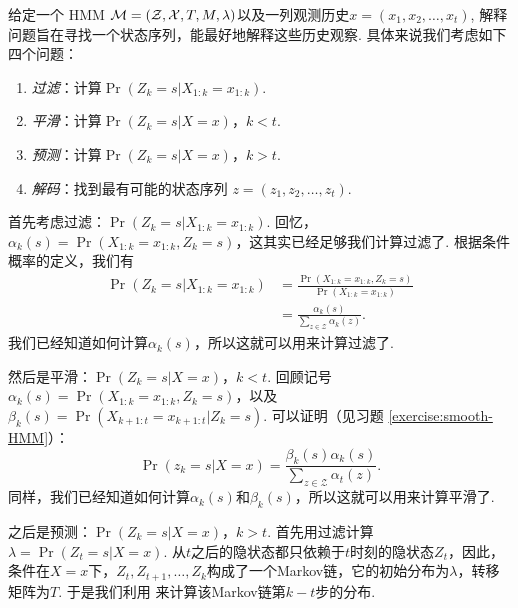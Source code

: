 给定一个 HMM $\mathcal M = (\mathcal Z, \mathcal X, T, M, \lambda)$以及一列观测历史$x = (x_1, x_2, \dots, x_t)$, 解释问题旨在寻找一个状态序列，能最好地解释这些历史观察. 具体来说我们考虑如下四个问题：
\begin{enumerate}
    \item \textit{过滤}：计算$\Pr(Z_k = s|X_{1:k}=x_{1:k})$.
    \item \textit{平滑}：计算$\Pr(Z_k = s|X=x)$，$k < t$.
    \item \textit{预测}：计算$\Pr(Z_k = s|X=x)$，$k > t$.
    \item \textit{解码}：找到最有可能的状态序列 $z = (z_1, z_2, \dots, z_t)$.
\end{enumerate}

首先考虑过滤：$\Pr(Z_k = s|X_{1:k}=x_{1:k})$. 回忆，$\alpha_k(s)= \Pr(X_{1:k}=x_{1:k}, Z_k=s)$，这其实已经足够我们计算过滤了. 根据条件概率的定义，我们有
\begin{align*}
    \Pr(Z_k = s|X_{1:k}=x_{1:k}) & = \frac{\Pr(X_{1:k}=x_{1:k}, Z_k=s)}{\Pr(X_{1:k}=x_{1:k})} \\
    &= \frac{\alpha_k(s)}{\sum_{z\in\mathcal Z}\alpha_k(z)}.
\end{align*}
我们已经知道如何计算$\alpha_k(s)$，所以这就可以用来计算过滤了.

然后是平滑：$\Pr(Z_k = s|X=x)$，$k < t$.  回顾记号$\alpha_k(s)= \Pr(X_{1:k}=x_{1:k}, Z_k=s)$，以及$\beta_k(s)=\Pr(X_{k+1:t}=x_{k+1:t} |Z_k=s)$. 可以证明（见习题 \ref{exercise:smooth-HMM}）：
\begin{equation}
    \Pr(z_k = s|X=x)=\frac{\beta_k(s)\alpha_k(s)}{\sum_{z\in\mathcal Z}\alpha_t(z)}.\label{eq:smooth}
\end{equation}
同样，我们已经知道如何计算$\alpha_k(s)$和$\beta_k(s)$，所以这就可以用来计算平滑了.

之后是预测：$\Pr(Z_k = s|X=x)$，$k > t$. 首先用过滤计算 $\lambda=\Pr(Z_t = s|X=x)$. 从$t$之后的隐状态都只依赖于$t$时刻的隐状态$Z_t$，因此，条件在$X=x$下，$Z_t,Z_{t+1},\dots,Z_k$构成了一个Markov链，它的初始分布为$\lambda$，转移矩阵为$T$. 于是我们利用 来计算该Markov链第$k-t$步的分布.

